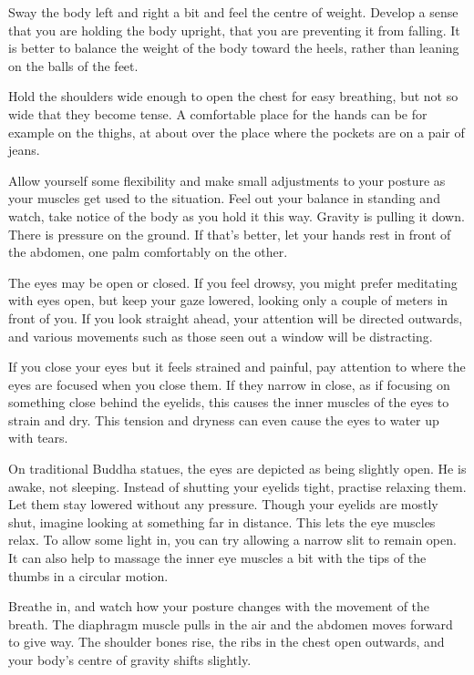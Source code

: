 Sway the body left and right a bit and feel the centre of weight.
Develop a sense that you are holding the body upright, that you are
preventing it from falling. It is better to balance the weight of the
body toward the heels, rather than leaning on the balls of the feet.

Hold the shoulders wide enough to open the chest for easy breathing, but
not so wide that they become tense. A comfortable place for the hands
can be for example on the thighs, at about over the place where the
pockets are on a pair of jeans.

Allow yourself some flexibility and make small adjustments to your
posture as your muscles get used to the situation. Feel out your balance
in standing and watch, take notice of the body as you hold it this way.
Gravity is pulling it down. There is pressure on the ground. If that's
better, let your hands rest in front of the abdomen, one palm
comfortably on the other.

The eyes may be open or closed. If you feel drowsy, you might prefer
meditating with eyes open, but keep your gaze lowered, looking only a
couple of meters in front of you. If you look straight ahead, your
attention will be directed outwards, and various movements such as those
seen out a window will be distracting.

If you close your eyes but it feels strained and painful, pay attention
to where the eyes are focused when you close them. If they narrow in
close, as if focusing on something close behind the eyelids, this causes
the inner muscles of the eyes to strain and dry. This tension and
dryness can even cause the eyes to water up with tears.

On traditional Buddha statues, the eyes are depicted as being slightly
open. He is awake, not sleeping. Instead of shutting your eyelids tight,
practise relaxing them. Let them stay lowered without any pressure.
Though your eyelids are mostly shut, imagine looking at something far in
distance. This lets the eye muscles relax. To allow some light in, you
can try allowing a narrow slit to remain open. It can also help to
massage the inner eye muscles a bit with the tips of the thumbs in a
circular motion.

Breathe in, and watch how your posture changes with the movement of the
breath. The diaphragm muscle pulls in the air and the abdomen moves
forward to give way. The shoulder bones rise, the ribs in the chest open
outwards, and your body's centre of gravity shifts slightly.

